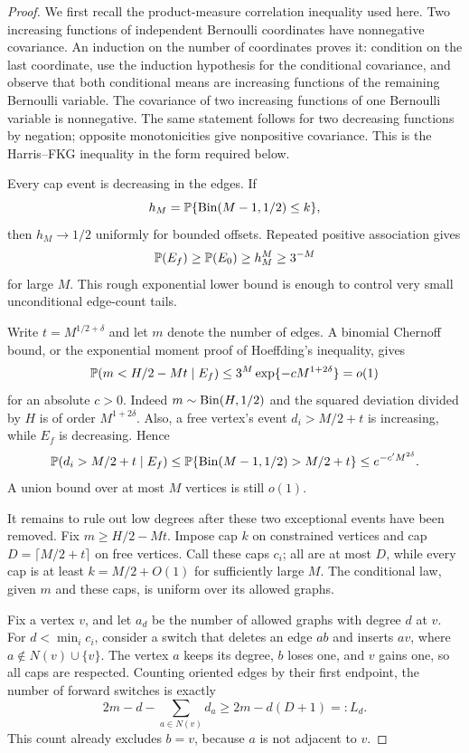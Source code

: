\begin{proof}
We first recall the product-measure correlation inequality used here. Two increasing functions of independent Bernoulli coordinates have nonnegative covariance. An induction on the number of coordinates proves it: condition on the last coordinate, use the induction hypothesis for the conditional covariance, and observe that both conditional means are increasing functions of the remaining Bernoulli variable. The covariance of two increasing functions of one Bernoulli variable is nonnegative. The same statement follows for two decreasing functions by negation; opposite monotonicities give nonpositive covariance. This is the Harris--FKG inequality in the form required below.

Every cap event is decreasing in the edges. If
\[
 h_M=\mathbb P\{\operatorname{Bin}(M-1,1/2)\le k\},
\]
then $h_M\to1/2$ uniformly for bounded offsets. Repeated positive association gives
\begin{equation}\label{ssm:eq:denominator}
 \mathbb P(E_f)\ge\mathbb P(E_0)\ge h_M^M\ge3^{-M}
\end{equation}
for large $M$. This rough exponential lower bound is enough to control very small unconditional edge-count tails.

Write $t=M^{1/2+\delta}$ and let $m$ denote the number of edges. A binomial Chernoff bound, or the exponential moment proof of Hoeffding's inequality, gives
\begin{equation}\label{ssm:eq:edgetail}
 \mathbb P(m<H/2-Mt\mid E_f)
 \le3^M\exp\{-cM^{1+2\delta}\}=o(1)
\end{equation}
for an absolute $c>0$. Indeed $m\sim\operatorname{Bin}(H,1/2)$ and the squared deviation divided by $H$ is of order $M^{1+2\delta}$. Also, a free vertex's event $d_i>M/2+t$ is increasing, while $E_f$ is decreasing. Hence
\[
 \mathbb P(d_i>M/2+t\mid E_f)
 \le\mathbb P\{\operatorname{Bin}(M-1,1/2)>M/2+t\}
 \le e^{-c'M^{2\delta}}.
\]
A union bound over at most $M$ vertices is still $o(1)$.

It remains to rule out low degrees after these two exceptional events have been removed. Fix $m\ge H/2-Mt$. Impose cap $k$ on constrained vertices and cap $D=\lceil M/2+t\rceil$ on free vertices. Call these caps $c_i$; all are at most $D$, while every cap is at least $k=M/2+O(1)$ for sufficiently large $M$. The conditional law, given $m$ and these caps, is uniform over its allowed graphs.

Fix a vertex $v$, and let $a_d$ be the number of allowed graphs with degree $d$ at $v$. For $d<\min_i c_i$, consider a switch that deletes an edge $ab$ and inserts $av$, where $a\notin N(v)\cup\{v\}$. The vertex $a$ keeps its degree, $b$ loses one, and $v$ gains one, so all caps are respected. Counting oriented edges by their first endpoint, the number of forward switches is exactly
\[
 2m-d-\sum_{a\in N(v)}d_a\ge 2m-d(D+1)=:L_d.
\]
This count already excludes $b=v$, because $a$ is not adjacent to $v$.


\end{proof}
